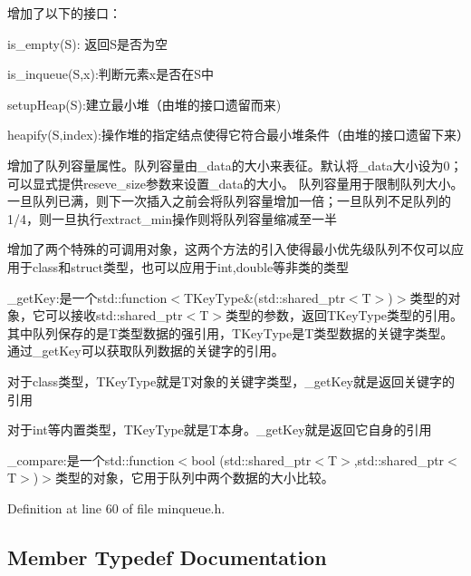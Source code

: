 \begin{DoxyItemize}
\item 增加了以下的接口：
\begin{DoxyItemize}
\item is\+\_\+empty(\+S)\+: 返回\+S是否为空
\item is\+\_\+inqueue(\+S,x)\+:判断元素x是否在\+S中
\item setup\+Heap(\+S)\+:建立最小堆（由堆的接口遗留而来)
\item heapify(\+S,index)\+:操作堆的指定结点使得它符合最小堆条件（由堆的接口遗留下来）
\end{DoxyItemize}
\item 增加了队列容量属性。队列容量由{\ttfamily \+\_\+data}的大小来表征。默认将{\ttfamily \+\_\+data}大小设为0；可以显式提供{\ttfamily reseve\+\_\+size}参数来设置{\ttfamily \+\_\+data}的大小。 队列容量用于限制队列大小。一旦队列已满，则下一次插入之前会将队列容量增加一倍；一旦队列不足队列的1/4，则一旦执行{\ttfamily extract\+\_\+min}操作则将队列容量缩减至一半
\item 增加了两个特殊的可调用对象，这两个方法的引入使得最小优先级队列不仅可以应用于class和struct类型，也可以应用于int,double等非类的类型
\begin{DoxyItemize}
\item \+\_\+get\+Key\+:是一个std\+:\+:function$<$T\+Key\+Type\&(std\+::shared\+\_\+ptr$<$\+T$>$)$>$类型的对象，它可以接收std\+::shared\+\_\+ptr$<$\+T$>$类型的参数，返回\+T\+Key\+Type类型的引用。 其中队列保存的是\+T类型数据的强引用，\+T\+Key\+Type是\+T类型数据的关键字类型。通过\+\_\+get\+Key可以获取队列数据的关键字的引用。
\begin{DoxyItemize}
\item 对于class类型，\+T\+Key\+Type就是\+T对象的关键字类型，\+\_\+get\+Key就是返回关键字的引用
\item 对于int等内置类型，\+T\+Key\+Type就是\+T本身。\+\_\+get\+Key就是返回它自身的引用
\end{DoxyItemize}
\item \+\_\+compare\+:是一个std\+:\+:function$<$bool (std\+::shared\+\_\+ptr$<$\+T$>$,std\+::shared\+\_\+ptr$<$\+T$>$)$>$类型的对象，它用于队列中两个数据的大小比较。 
\end{DoxyItemize}
\end{DoxyItemize}

Definition at line 60 of file minqueue.\+h.



\subsection{Member Typedef Documentation}
\hypertarget{class_introduction_to_algorithm_1_1_queue_algorithm_1_1_min_queue_a8f2f5b5d2b7097bbc6edda7b9c9228a6}{}
